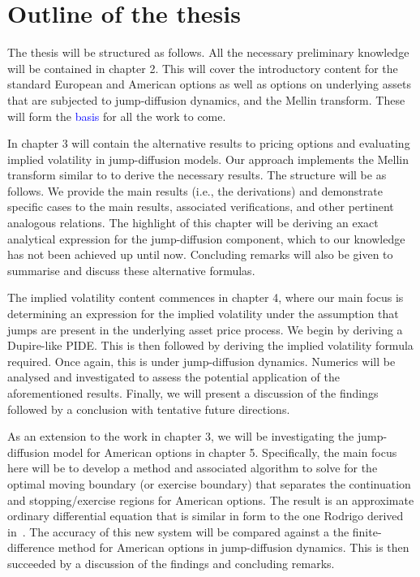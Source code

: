 		
		
		
\section{Outline of the thesis}
		The thesis will be structured as follows. All the necessary preliminary knowledge will be contained in chapter 2. This will cover the introductory content for the standard European and American options as well as options on underlying assets that are subjected to jump-diffusion dynamics, and the Mellin transform. These will form the \textcolor{blue}{basis} for all the work to come. 
		
		In chapter 3 will contain the alternative results to pricing options and evaluating implied volatility in jump-diffusion models. Our approach implements the Mellin transform similar to \cite{Frontczak2013} to derive the necessary results. The structure will be as follows. We provide the main results (i.e., the derivations) and demonstrate specific cases to the main results, associated verifications, and other pertinent analogous relations. The highlight of this chapter will be deriving an exact analytical expression for the jump-diffusion component, which to our knowledge has not been achieved up until now. Concluding remarks will also be given to summarise and discuss these alternative formulas.
		 
		The implied volatility content commences in chapter 4, where our main focus is determining an expression for the implied volatility under the assumption that jumps are present in the underlying asset price process. We begin by deriving a Dupire-like PIDE. This is then followed by deriving the implied volatility formula required. Once again, this is under jump-diffusion dynamics. Numerics will be analysed and investigated to assess the potential application of the aforementioned results. Finally, we will present a discussion of the findings followed by a conclusion with tentative future directions.
		
		As an extension to the work in chapter 3, we will be investigating the jump-diffusion model for American options in chapter 5. Specifically, the main focus here will be to develop a method and associated algorithm to solve for the optimal moving boundary (or exercise boundary) that separates the continuation and stopping/exercise regions for American options. The result is an approximate ordinary differential equation that is similar in form to the one Rodrigo derived in~\cite{Rodrigo2013}. The accuracy of this new system will be compared against a the finite-difference method for American options in jump-diffusion dynamics. This is then succeeded by a discussion of the findings and concluding remarks.
		
